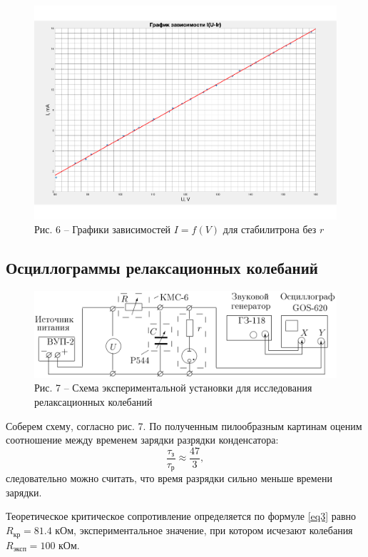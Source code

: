 \documentclass[a4paper,14pt]{article}
\begin{document}
\begin{center}
	\begin{figure}[bhtp]
		\centering
		\includegraphics[width=0.85\linewidth]{gg2.pdf} \\
		Рис. 6 -- Графики зависимостей $I= f(V)$ для стабилитрона без $r$
	\end{figure}
\end{center}


\subsection*{Осциллограммы релаксационных колебаний}

\begin{figure}[bhtp]
	\centering
	\includegraphics[width =14cm]{5} \\
	Рис. 7 -- Схема экспериментальной установки для исследования релаксационных колебаний
\end{figure}

Соберем схему, согласно рис. 7. По полученным пилообразным картинам оценим соотношение между временем зарядки разрядки конденсатора: 
$$\dfrac{\tau_{\text{з}}}{\tau_{\text{р}}} \approx \dfrac{47}{3},$$
следовательно можно считать, что время разрядки сильно меньше времени зарядки.

Теоретическое критическое сопротивление определяется по формуле \eqref{eq3} равно $R_{\text{кр}} = 81.4$ кОм, экспериментальное значение, при котором исчезают
колебания $R_{\text{эксп}} = 100$ кОм.
\end{document}
